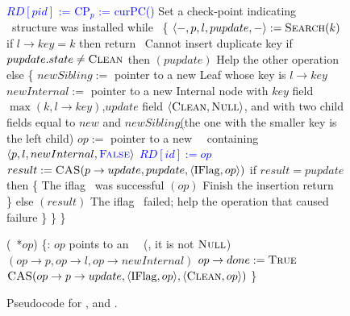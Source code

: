 \begin{figure}[H]
\begin{code}
		\textcolor{blue} {$RD[pid]$ := \init} \nlc
		\textcolor{blue} {$\text{CP}_p$ := curPC()}  \tabtabcom Set a check-point indicating \IFlag\ structure was installed \label{BSTinsert-set-checkpoint} \nlc
		while \TRUE\ \{  \nlc
		\n $\langle -, p, l, pupdate, - \rangle := \mbox{\sc Search}(k)$ \label{ins-search}\nlc
		if $l \rightarrow key = k$ then return \FALSE\ \tabtabcom Cannot insert duplicate key\label{insert-false}\nlc
		if $pupdate.state \neq \mbox{\sc Clean}$ then $(pupdate)$ \tabtabcom Help the other operation \label{ins-help-unclean}\nlc
		else \{\nlc
		\n        $newSibling :=$ pointer to a new Leaf whose key is $l\rightarrow key$\nlc
		$newInternal :=$ pointer to a new Internal node with $key$ field $\max(k, l \rightarrow key)$,\label{create-internal}\ul      
		\n      $update$ field $\langle \mbox{\sc Clean}, \mbox{\sc Null}\rangle$, and with two
		child fields equal to $new$ and $newSibling$\ul 
		(the one with the smaller key is the left child)\nlc
		\p        $op :=$ pointer to a new \IFlag\ \record\  containing $\langle p, l, newInternal, \textcolor{blue}{\mbox{\sc False}}\rangle$\label{new-IFlag}\nlc
		\textcolor{blue}{$RD[id] := op$} \label{insert-write-announce} \nlc
		$result := \mbox{\sc CAS}(p\rightarrow update, pupdate, \langle \mbox{IFlag}, op\rangle)$ \label{iflag-cas} \nlc
		if $result = pupdate$ then \{ \tabtabcom The iflag \CASB\ was successful\nlc
		\n            {}$(op)$ \tabtabcom Finish the insertion\label{finish-insert}\nlc
		return \TRUE\ \label{insert-true}\nlc
		\p        \}\nlc 
		else $(result)$ \tabcom The iflag \CASB\ failed; help the operation that caused failure\label{ins-help-after-failure}\nlc
		\p    \}\nlc
		\p\}\nlc 
		\p
		\}\bl
		\nlc
		
		(\IFlag\ *$op$) \{\ul
		\n     {}:  $op$ points to an \IFlag\ \record\  (\ie, it is not $\mbox{\sc Null}$)\nlc
		$(op\rightarrow p, op\rightarrow l, op\rightarrow newInternal)$ \label{ichild-cas}\nlc
		\textcolor{blue}{$op \rightarrow done := \mbox{\sc True}$} \nlc 
		$\mbox{\sc CAS}(op\rightarrow p\rightarrow update, \langle \mbox{IFlag}, op \rangle, \langle \mbox{\sc Clean}, op\rangle)$  \label{iunflag-cas}\nlc
		\p
		\}
	\end{code}
	\caption{\label{code2}Pseudocode for ,  and .}
\end{figure}

